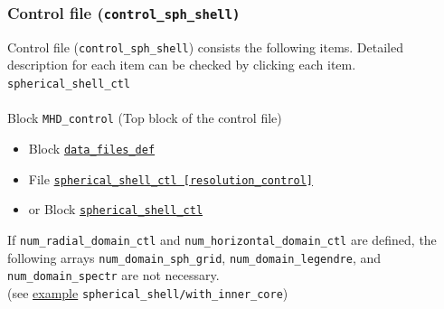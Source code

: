 \subsubsection{Control file (\tt{control\_sph\_shell})}
\label{section:control_sph_shell}
Control file ({\tt control\_sph\_shell}) consists the following items. Detailed description for each item can be checked by clicking each item.
\\
%
\verb|spherical_shell_ctl|
\label{href_i:spherical_shell_ctl}
\\
\\
%
Block {\tt MHD\_control} (Top block of the control file)
	\begin{itemize}
	\item Block \hyperref[href_t:data_files_def]{\tt data\_files\_def}
	\item File \hyperref[href_t:spherical_shell_ctl]{\tt spherical\_shell\_ctl    [resolution\_control]}
	\item or Block \hyperref[href_t:spherical_shell_ctl]{\tt spherical\_shell\_ctl}
	\end{itemize}

If \verb|num_radial_domain_ctl| and \verb|num_horizontal_domain_ctl| are defined, the following arrays \verb|num_domain_sph_grid|, \verb|num_domain_legendre|, and \verb|num_domain_spectr| are not necessary. \\
(see \hyperref[href_t:gen_w_innercore]{example} \verb|spherical_shell/with_inner_core|)
%
